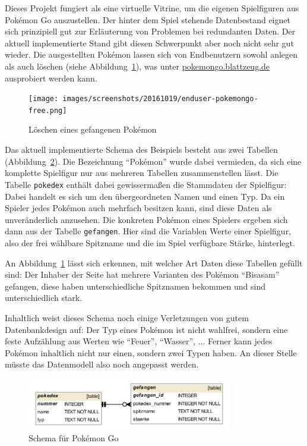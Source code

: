 Dieses Projekt fungiert als eine virtuelle Vitrine, um die eigenen Spielfiguren aus Pokémon Go auszustellen. Der hinter dem Spiel stehende Datenbestand eignet sich prinzipiell gut zur Erläuterung von Problemen bei redundanten Daten. Der aktuell implementierte Stand gibt diesen Schwerpunkt aber noch nicht sehr gut wieder. Die ausgestellten Pokémon lassen sich von Endbenutzern sowohl anlegen als auch löschen (siehe Abbildung~\ref{fig:enduser-pokemongo-delete}), was unter \href{http://pokemongo.blattzeug.de/}{\mbox{pokemongo.blattzeug.de}} ausprobiert werden kann.

\begin{figure}[h]
  \centering \texttt{[image: images/screenshots/20161019/enduser-pokemongo-free.png]}
  \caption{Löschen eines gefangenen Pokémon}
  \label{fig:enduser-pokemongo-delete}
\end{figure}

Das aktuell implementierte Schema des Beispiels besteht aus zwei Tabellen (Abbildung~\ref{fig:project-pokemongo-schema}). Die Bezeichnung "`Pokémon"' wurde dabei vermieden, da sich eine komplette Spielfigur nur aus mehreren Tabellen zusammenstellen lässt. Die Tabelle \texttt{pokedex} enthält dabei gewissermaßen die Stammdaten der Spielfigur: Dabei handelt es sich um den übergeordneten Namen und einen Typ. Da ein Spieler jedes Pokémon auch mehrfach besitzen kann, sind diese Daten als unveränderlich anzusehen. Die konkreten Pokémon eines Spielers ergeben sich dann aus der Tabelle \texttt{gefangen}. Hier sind die Variablen Werte einer Spielfigur, also der frei wählbare Spitzname und die im Spiel verfügbare Stärke, hinterlegt.

An Abbildung~\ref{fig:enduser-pokemongo-delete} lässt sich erkennen, mit welcher Art Daten diese Tabellen gefüllt sind: Der Inhaber der Seite hat mehrere Varianten des Pokémon "`Bisasam"' gefangen, diese haben unterschiedliche Spitznamen bekommen und sind unterschiedlich stark.

Inhaltlich weist dieses Schema noch einige Verletzungen von gutem Datenbankdesign auf: Der Typ eines Pokémon ist nicht wahlfrei, sondern eine feste Aufzählung aus Werten wie "`Feuer"', "`Wasser"', ... Ferner kann jedes Pokémon inhaltlich nicht nur einen, sondern zwei Typen haben. An dieser Stelle müsste das Datenmodell also noch angepasst werden.

\begin{figure}[h]
  \centering \includegraphics[width=0.8\textwidth]{images/db-schema/pokemongo}
  \caption{Schema für Pokémon Go}
  \label{fig:project-pokemongo-schema}
\end{figure}

